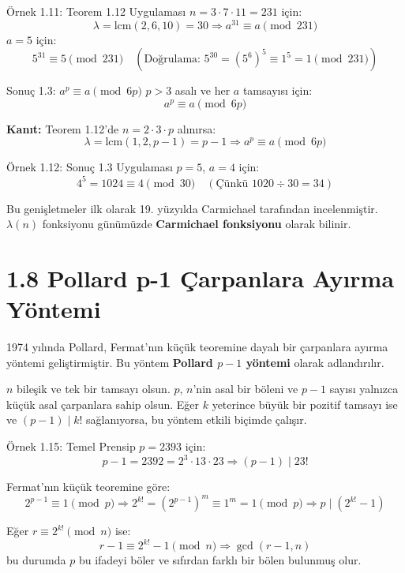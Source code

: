 \begin{examplebox}{Örnek 1.11: Teorem 1.12 Uygulaması}
$n = 3 \cdot 7 \cdot 11 = 231$ için:
\[
\lambda = \text{lcm}(2,6,10) = 30 \Rightarrow a^{31} \equiv a \pmod{231}
\]
$a = 5$ için:
\[
5^{31} \equiv 5 \pmod{231} \quad (\text{Doğrulama: } 5^{30} = (5^6)^5 \equiv 1^5 = 1 \pmod{231})
\]
\end{examplebox}

\begin{theorembox}{Sonuç 1.3: $a^p \equiv a \pmod{6p}$}
$p > 3$ asalı ve her $a$ tamsayısı için:
\[
a^p \equiv a \pmod{6p}
\]

\textbf{Kanıt:} Teorem 1.12'de $n = 2 \cdot 3 \cdot p$ alınırsa:
\[
\lambda = \text{lcm}(1,2,p-1) = p-1 \Rightarrow a^p \equiv a \pmod{6p}
\]
\end{theorembox}

\begin{examplebox}{Örnek 1.12: Sonuç 1.3 Uygulaması}
$p = 5$, $a = 4$ için:
\[
4^5 = 1024 \equiv 4 \pmod{30} \quad (\text{Çünkü } 1020 \div 30 = 34)
\]
\end{examplebox}

\begin{tcolorbox}[colback=gray!10, colframe=black, title={Tarihsel Not}]
Bu genişletmeler ilk olarak 19. yüzyılda Carmichael tarafından incelenmiştir. $\lambda(n)$ fonksiyonu günümüzde \textbf{Carmichael fonksiyonu} olarak bilinir.
\end{tcolorbox}

\section*{1.8 Pollard p-1 Çarpanlara Ayırma Yöntemi}

1974 yılında Pollard, Fermat'nın küçük teoremine dayalı bir çarpanlara ayırma yöntemi geliştirmiştir. Bu yöntem \textbf{Pollard $p - 1$ yöntemi} olarak adlandırılır.

$n$ bileşik ve tek bir tamsayı olsun. $p$, $n$'nin asal bir böleni ve $p - 1$ sayısı yalnızca küçük asal çarpanlara sahip olsun. Eğer $k$ yeterince büyük bir pozitif tamsayı ise ve $(p - 1) \mid k!$ sağlanıyorsa, bu yöntem etkili biçimde çalışır.

\begin{examplebox}{Örnek 1.15: Temel Prensip}
$p = 2393$ için:
\[
p - 1 = 2392 = 2^3 \cdot 13 \cdot 23 \Rightarrow (p - 1) \mid 23!
\]

Fermat'nın küçük teoremine göre:
\[
2^{p - 1} \equiv 1 \pmod{p} \Rightarrow 2^{k!} = (2^{p - 1})^m \equiv 1^m = 1 \pmod{p}
\Rightarrow p \mid (2^{k!} - 1)
\]

Eğer $r \equiv 2^{k!} \pmod{n}$ ise:
\[
r - 1 \equiv 2^{k!} - 1 \pmod{n}
\Rightarrow \gcd(r - 1, n)
\]
bu durumda $p$ bu ifadeyi böler ve sıfırdan farklı bir bölen bulunmuş olur.
\end{examplebox}

